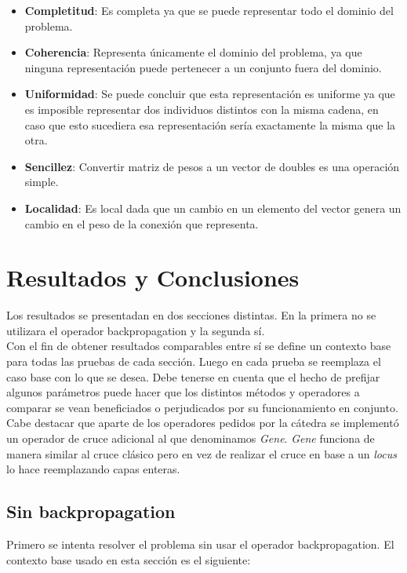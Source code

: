 \documentclass{sig-alternate}
\begin{document}
	\begin{itemize}

		\item \textbf{Completitud}: Es completa ya que se puede representar todo el dominio del problema.

		\item \textbf{Coherencia}: Representa únicamente el dominio del problema, ya que ninguna representación puede pertenecer a un conjunto fuera del dominio.

		\item \textbf{Uniformidad}: Se puede concluir que esta representación es uniforme ya que es imposible representar dos individuos distintos con la misma cadena, en caso que esto sucediera esa representación sería exactamente la misma que la otra.	

		\item \textbf{Sencillez}: Convertir matriz de pesos a un vector de doubles es una operación simple.

		\item \textbf{Localidad}: Es local dada que un cambio en un elemento
		del vector genera un cambio en el peso de la conexión que representa.

	\end{itemize}
	
\section{Resultados y Conclusiones}
	Los resultados se presentadan en dos secciones distintas.
	En la primera no se utilizara el operador backpropagation y la segunda sí. \\

	Con el fin de obtener resultados comparables entre sí se define un
	contexto base para todas las pruebas de cada sección.
	Luego en cada prueba se reemplaza el caso base con lo que se desea.
	Debe tenerse en cuenta que el hecho de prefijar algunos parámetros puede
	hacer que los distintos métodos y operadores a comparar se vean
	beneficiados o perjudicados por su funcionamiento en conjunto. \\

	Cabe destacar que aparte de los operadores pedidos por la cátedra se
	implementó un operador de cruce adicional al que denominamos \textit{Gene}.
	\textit{Gene} funciona de manera similar al cruce clásico pero en vez de
	realizar el cruce en base a un \textit{locus} lo hace reemplazando
	capas enteras.


	\subsection{Sin backpropagation}
	Primero se intenta resolver el problema sin usar el operador backpropagation.
	El contexto base usado en esta sección es el siguiente:
\end{document}
